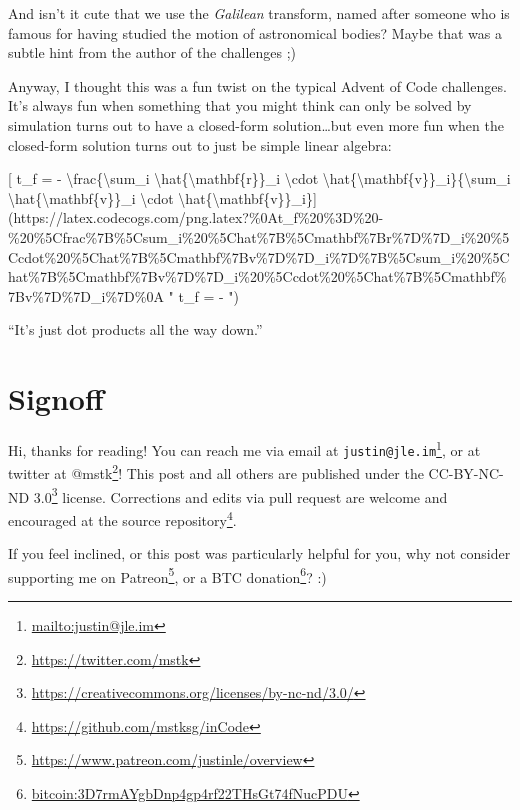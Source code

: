 \documentclass[]{article}
\renewcommand{\href}[2]{#2\footnote{\url{#1}}}
\begin{document}
And isn't it cute that we use the \emph{Galilean} transform, named after someone
who is famous for having studied the motion of astronomical bodies? Maybe that
was a subtle hint from the author of the challenges ;)

Anyway, I thought this was a fun twist on the typical Advent of Code challenges.
It's always fun when something that you might think can only be solved by
simulation turns out to have a closed-form solution\ldots{}but even more fun
when the closed-form solution turns out to just be simple linear algebra:

{[} t\_f = - \textbackslash{}frac\{\textbackslash{}sum\_i
\textbackslash{}hat\{\textbackslash{}mathbf\{r\}\}\_i \textbackslash{}cdot
\textbackslash{}hat\{\textbackslash{}mathbf\{v\}\}\_i\}\{\textbackslash{}sum\_i
\textbackslash{}hat\{\textbackslash{}mathbf\{v\}\}\_i \textbackslash{}cdot
\textbackslash{}hat\{\textbackslash{}mathbf\{v\}\}\_i\}{]}(https://latex.codecogs.com/png.latex?\%0At\_f\%20\%3D\%20-\%20\%5Cfrac\%7B\%5Csum\_i\%20\%5Chat\%7B\%5Cmathbf\%7Br\%7D\%7D\_i\%20\%5Ccdot\%20\%5Chat\%7B\%5Cmathbf\%7Bv\%7D\%7D\_i\%7D\%7B\%5Csum\_i\%20\%5Chat\%7B\%5Cmathbf\%7Bv\%7D\%7D\_i\%20\%5Ccdot\%20\%5Chat\%7B\%5Cmathbf\%7Bv\%7D\%7D\_i\%7D\%0A
" t\_f = -
")

``It's just dot products all the way down.''

\hypertarget{signoff}{%
\section{Signoff}\label{signoff}}

Hi, thanks for reading! You can reach me via email at
\href{mailto:justin@jle.im}{\nolinkurl{justin@jle.im}}, or at twitter at
\href{https://twitter.com/mstk}{@mstk}! This post and all others are published
under the \href{https://creativecommons.org/licenses/by-nc-nd/3.0/}{CC-BY-NC-ND
3.0} license. Corrections and edits via pull request are welcome and encouraged
at \href{https://github.com/mstksg/inCode}{the source repository}.

If you feel inclined, or this post was particularly helpful for you, why not
consider \href{https://www.patreon.com/justinle/overview}{supporting me on
Patreon}, or a \href{bitcoin:3D7rmAYgbDnp4gp4rf22THsGt74fNucPDU}{BTC donation}?
:)
\end{document}

